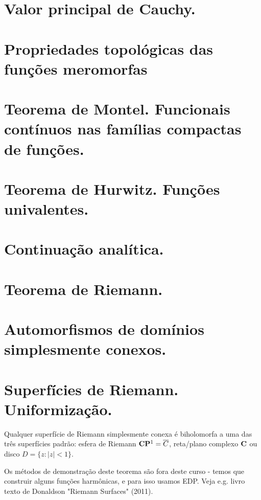 \section{Valor principal de Cauchy.}

\section{Propriedades topológicas das funções meromorfas}

\section{Teorema de Montel. Funcionais contínuos nas famílias compactas de funções.}

\section{Teorema de Hurwitz. Funções univalentes.}

\section{Continuação analítica.}

\section{Teorema de Riemann.}

\section{Automorfismos de domínios simplesmente conexos.}

\section{Superfícies de Riemann. Uniformização.}

\begin{teorema}
Qualquer superfície de Riemann simplesmente conexa é biholomorfa a uma das três superfícies padrão:
esfera de Riemann $\mathbf{C}\mathbf{P}^1 = \overline{C}$, reta/plano complexo $\mathbf{C}$ ou disco $D = \{z : |z|<1\}$.
\end{teorema}
Os métodos de demonstração deste teorema são fora deste curso - temos que construir alguns funções
harmônicas, e para isso usamos EDP. Veja e.g. livro texto de Donaldson "Riemann Surfaces" (2011).

